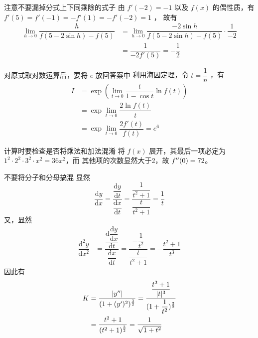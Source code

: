 \begin{answer}[660T29]{注意不要漏掉分式上下同乘除的式子}
    由 $ f'(-2) = -1 $ 以及 $ f(x) $ 的偶性质，有 $f'(5) = f'(-1) = -f'(1) = -f'(-2) = 1 $ ，
    故有\begin{equation*}
        \begin{aligned}
            {\displaystyle\lim_{h\rightarrow 0}}\dfrac{h}{f(5-2\sin h)-f(5)} &= 
            {\displaystyle\lim_{h\rightarrow 0}}\dfrac{-2\sin h}{f(5-2\sin h)-f(5)} \cdot \dfrac{1}{-2}\\&=
            \dfrac{1}{-2f'(5)} = -\dfrac{1}{2}
        \end{aligned}
    \end{equation*}
\end{answer}

\begin{answer}[660T30]{对原式取对数运算后，要将 $ e $ 放回答案中}
    利用海因定理，令 $ t = \dfrac{1}{n} $ ，有 \begin{equation*}
        \begin{aligned}
            I &= \exp \left( {\displaystyle\lim_{t\rightarrow 0}} 
            \dfrac{t}{1-\cos t}\ln f(t) \right)\\&=\exp{\displaystyle\lim_{t\rightarrow 0}}
            \dfrac{2\ln f(t)}{t}\\&=\exp{\displaystyle\lim_{t\rightarrow 0}}
            \dfrac{2f'(t)}{f(t)} = e^6
        \end{aligned}
    \end{equation*}
\end{answer}

\begin{answer}[600T33]{计算时要检查是否将乘法和加法混淆}
    将 $ f(x) $ 展开，其最后一项必定为 $ 1^2\cdot 2^2\cdot 3^2\cdot x^2 = 36x^2 $，而
    其他项的次数显然大于2，故 $ f^{\prime\prime}(0) = 72$。
\end{answer}

\begin{answer}[660T34]{不要将分子和分母搞混}
    显然 $$ \dfrac{\mathrm{d}y}{\mathrm{d}x} = 
    \dfrac{\dfrac{\mathrm{d}y}{\mathrm{d}t}}{\dfrac{\mathrm{d}x}{\mathrm{d}t}}
    = \dfrac{\dfrac{1}{t^2+1}}{\dfrac{t}{t^2+1}} = \dfrac{1}{t} $$ 又，显然
    \begin{equation*}
        \begin{aligned}
            \dfrac{\mathrm{d}^2y}{\mathrm{d}x^2}&= 
            \dfrac{\dfrac{\mathrm{d}\dfrac{\mathrm{d}y}{\mathrm{d}x}}{\mathrm{d}t}}{\dfrac{\mathrm{d}x}{\mathrm{d}t}}
            =\dfrac{-\dfrac{1}{t^2}}{\dfrac{t}{t^2+1}} = -\dfrac{t^2+1}{t^3}
        \end{aligned}
    \end{equation*}
    因此有 \begin{equation*}
        \begin{aligned}
            K&= \dfrac{|y^{\prime\prime}|}{(1+(y')^2)^{\frac{3}{2}}} = 
            \dfrac{\dfrac{t^2+1}{|t|^3}}{(1+\dfrac{1}{t^2})^{\frac{3}{2}}}
            \\&= \dfrac{t^2+1}{(t^2+1)^\frac{3}{2}} = \dfrac{1}{\sqrt{1+t^2}}
        \end{aligned}
    \end{equation*}
\end{answer}

